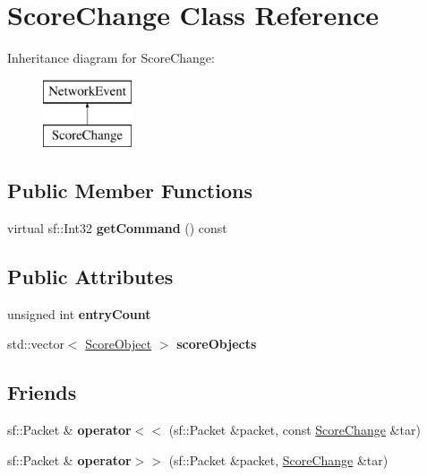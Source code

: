 \hypertarget{class_score_change}{\section{Score\-Change Class Reference}
\label{class_score_change}
}
Inheritance diagram for Score\-Change\-:\begin{figure}[H]
\begin{center}
\leavevmode
\includegraphics[height=2.000000cm]{class_score_change}
\end{center}
\end{figure}
\subsection*{Public Member Functions}
\begin{DoxyCompactItemize}
\item 
\hypertarget{class_score_change_a4e5b48b2651c1ac8139ddb5a63ab2c7e}{virtual sf\-::\-Int32 {\bfseries get\-Command} () const }\label{class_score_change_a4e5b48b2651c1ac8139ddb5a63ab2c7e}

\end{DoxyCompactItemize}
\subsection*{Public Attributes}
\begin{DoxyCompactItemize}
\item 
\hypertarget{class_score_change_a68080c0e280f46d57a0dbb14854a9580}{unsigned int {\bfseries entry\-Count}}\label{class_score_change_a68080c0e280f46d57a0dbb14854a9580}

\item 
\hypertarget{class_score_change_a48a51fac5ced15ec32daaf2e778d42f1}{std\-::vector$<$ \hyperlink{struct_score_object}{Score\-Object} $>$ {\bfseries score\-Objects}}\label{class_score_change_a48a51fac5ced15ec32daaf2e778d42f1}

\end{DoxyCompactItemize}
\subsection*{Friends}
\begin{DoxyCompactItemize}
\item 
\hypertarget{class_score_change_a11ea360d235b8e4c32070d5817693663}{sf\-::\-Packet \& {\bfseries operator$<$$<$} (sf\-::\-Packet \&packet, const \hyperlink{class_score_change}{Score\-Change} \&tar)}\label{class_score_change_a11ea360d235b8e4c32070d5817693663}

\item 
\hypertarget{class_score_change_a7764eb6d9ec7a6ff87fdf38f211440db}{sf\-::\-Packet \& {\bfseries operator$>$$>$} (sf\-::\-Packet \&packet, \hyperlink{class_score_change}{Score\-Change} \&tar)}\label{class_score_change_a7764eb6d9ec7a6ff87fdf38f211440db}

\end{DoxyCompactItemize}

